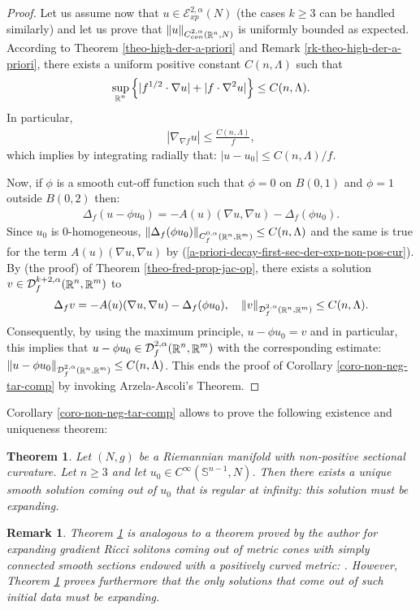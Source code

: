 \documentclass[a4paper,11pt,reqno]{amsart}
\newtheorem{theo}[defn]{Theorem}
\newtheorem{rk}[defn]{Remark}
\def\R{\mathop{\rm \mathbb{R}}\nolimits}
\newcommand{\Ent}{\mathcal{E}}
\begin{document}
\begin{proof}
Let us assume now that $u\in\Ent_{xp}^{2,\alpha}(N)$ (the cases $k\geq 3$ can be handled similarly) and let us prove that $\|u\|_{C^{2,\alpha}_{con}(\R^n,N)}$ is uniformly bounded as expected. According to Theorem \ref{theo-high-der-a-priori} and Remark \ref{rk-theo-high-der-a-priori}, there exists a uniform positive constant $C(n,\Lambda)$ such that 
\begin{eqnarray}
\sup_{\R^n}\left\{|f^{1/2}\cdot \nabla u|+|f\cdot \nabla^2 u|\right\}\leq C(n,\Lambda). \label{a-priori-decay-first-sec-der-exp-non-pos-cur}
\end{eqnarray}
In particular, 
\begin{eqnarray*}
|\nabla_{\nabla f}u|\leq\frac{C(n,\Lambda)}{f},
\end{eqnarray*}
which implies by integrating radially that: $|u-u_0|\leq C(n,\Lambda)/f$. 

Now, if $\phi$ is a smooth cut-off function such that $\phi=0$ on $B(0,1)$ and $\phi=1$ outside $B(0,2)$ then:
\begin{eqnarray}
\Delta_f(u-\phi u_0)=-A(u)(\nabla u,\nabla u)-\Delta_f(\phi u_0).\label{equ-sol-substract-init-cond}
\end{eqnarray}
Since $u_0$ is $0$-homogeneous, $\|\Delta_f(\phi u_0)\|_{C^{0,\alpha}_{f}(\R^n,\R^m)}\leq C(n,\Lambda)$ and the same is true for the term $A(u)(\nabla u,\nabla u)$ by (\ref{a-priori-decay-first-sec-der-exp-non-pos-cur}). By (the proof) of Theorem \ref{theo-fred-prop-jac-op}, there exists a solution $v\in \mathcal{D}_f^{k+2,\alpha}(\R^n,\R^m)$ to $$\Delta_fv=-A(u)(\nabla u,\nabla u)-\Delta_f(\phi u_0),\quad \|v\|_{\mathcal{D}_f^{2,\alpha}(\R^n,\R^m)}\leq C(n,\Lambda).$$ Consequently, by using the maximum principle, $u-\phi u_0=v$ and in particular, this implies that $u-\phi u_0\in \mathcal{D}_f^{2,\alpha}(\R^n,\R^m)$ with the corresponding estimate: $\|u-\phi u_0\|_{\mathcal{D}_f^{2,\alpha}(\R^n,\R^m)}\leq C(n,\Lambda)$. This ends the proof of Corollary \ref{coro-non-neg-tar-comp} by invoking Arzela-Ascoli's Theorem.



\end{proof}

Corollary \ref{coro-non-neg-tar-comp} allows to prove the following existence and uniqueness theorem:
\begin{theo}\label{exi-uni-non-neg-cur}
Let $(N,g)$ be a Riemannian manifold with non-positive sectional curvature.
Let $n\geq 3$ and let $u_0\in C^{\infty}(\mathbb{S}^{n-1},N)$. Then there exists a unique smooth solution coming out of $u_0$ that is regular at infinity: this solution must be expanding.
\end{theo}
\begin{rk}\label{rk-theo-rf-vs-hmf}
Theorem \ref{exi-uni-non-neg-cur} is analogous to a theorem proved by the author for expanding gradient Ricci solitons coming out of metric cones with simply connected smooth sections endowed with a positively curved metric: \cite{Der-Smo-Pos-Met-Con}. However, Theorem \ref{exi-uni-non-neg-cur} proves furthermore that the only solutions that come out of such initial data must be expanding.
\end{rk}
\end{document}
